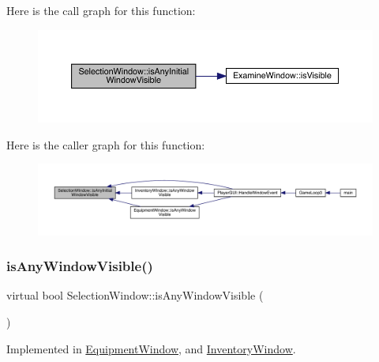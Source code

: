 Here is the call graph for this function\+:
\nopagebreak
\begin{figure}[H]
\begin{center}
\leavevmode
\includegraphics[width=350pt]{db/d9c/class_selection_window_a40ffbdbd4b8bc3ef84208faed2ae97da_cgraph}
\end{center}
\end{figure}
Here is the caller graph for this function\+:
\nopagebreak
\begin{figure}[H]
\begin{center}
\leavevmode
\includegraphics[width=350pt]{db/d9c/class_selection_window_a40ffbdbd4b8bc3ef84208faed2ae97da_icgraph}
\end{center}
\end{figure}
\mbox{\label{class_selection_window_ad68953313a12ca42cafea68e15077c86}} 
\subsubsection{\texorpdfstring{is\+Any\+Window\+Visible()}{isAnyWindowVisible()}}
{\footnotesize\ttfamily virtual bool Selection\+Window\+::is\+Any\+Window\+Visible (\begin{DoxyParamCaption}{ }\end{DoxyParamCaption})\hspace{0.3cm}{\ttfamily [pure virtual]}}



Implemented in \mbox{\hyperlink{class_equipment_window_a8d311134213a637a7de2d9a3885c716c}{Equipment\+Window}}, and \mbox{\hyperlink{class_inventory_window_a6fd4220caaec67979e93f5b8b52365a8}{Inventory\+Window}}.

